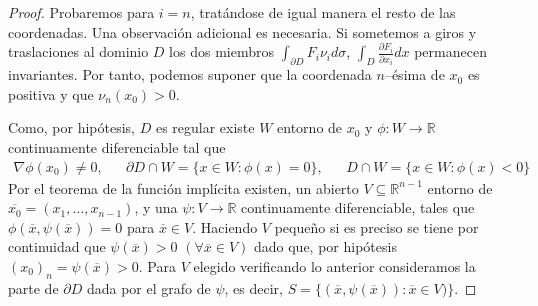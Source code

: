 \documentclass{report}
\newcommand{\realNumbers}{\mathbb{R}}
\theoremstyle{definition}
\theoremstyle{remark}
\begin{document}
\begin{proof}
    Probaremos para \(i = n\), tratándose de igual manera el resto de las coordenadas.
    Una observación adicional es necesaria.
    Si sometemos a giros y traslaciones al dominio \(D\) los dos miembros 
    \(
      \int_{\partial D}
        F_i \nu_i
      d \sigma
    \),
    \(
      \int_D
        \frac{\partial F_i}{\partial x_i}
      dx
    \)
    permanecen invariantes.  %
    Por tanto, podemos suponer que la coordenada \(n\)--ésima de \(x_0\) es positiva y que \(\nu_n(x_0) > 0\).

    Como, por hipótesis, \(D\) es regular existe \(W\) entorno de \(x_0\) y \(\phi : W \rightarrow \realNumbers\) continuamente diferenciable tal que
    \begin{align}
      \nabla \phi (x_0) \neq 0,
      &&\partial D \cap W
      =
      \{x \in W : \phi(x) = 0\},
      &&D \cap W
      =
      \{x \in W : \phi(x) < 0\}
    \end{align}
    Por el teorema de la función implícita existen, un abierto \(V \subseteq \realNumbers^{n - 1}\) entorno de \(\overline{x_0} = (x_1, \dots, x_{n - 1})\),
    y una \(\psi : V \rightarrow \realNumbers\) continuamente diferenciable, tales que \(\phi(\overline{x}, \psi(\overline{x})) = 0\) para \(\overline{x} \in V\).
    Haciendo \(V\) pequeño si es preciso se tiene por continuidad que \(\psi(\overline{x}) > 0\) \((\forall \overline{x} \in V)\) dado que, por hipótesis \((x_0)_n = \psi(\overline{x}) > 0\).
    Para \(V\) elegido verificando lo anterior consideramos la parte de \(\partial D\) dada por el grafo de \(\psi\), es decir,
    \(S = \{
      (\overline{x}, \psi(\overline{x})) : \overline{x} \in V
    )\}\).


\end{proof}
\end{document}
